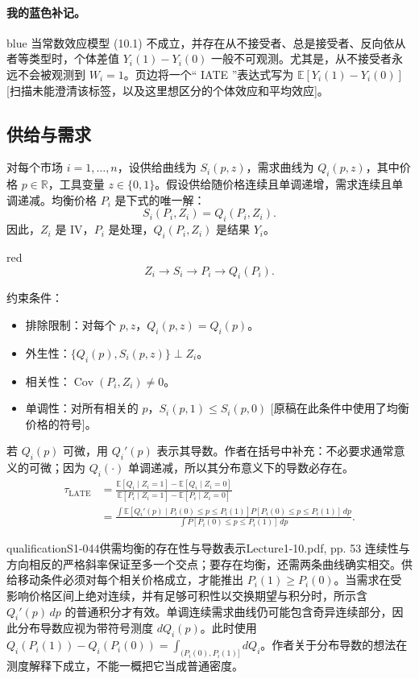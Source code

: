 \paragraph{我的蓝色补记。}
\begin{inkblock}{blue}
当常数效应模型 (10.1) 不成立，并存在从不接受者、总是接受者、反向依从者等类型时，个体差值 $Y_i(1)-Y_i(0)$ 一般不可观测。尤其是，从不接受者永远不会被观测到 $W_i=1$。页边将一个“ IATE ”表达式写为 $\mathbb E[Y_i(1)-Y_i(0)]$ [扫描未能澄清该标签，以及这里想区分的个体效应和平均效应]。
\end{inkblock}


\subsection{供给与需求}
对每个市场 $i=1,\ldots,n$，设供给曲线为 $S_i(p,z)$，需求曲线为 $Q_i(p,z)$，其中价格 $p\in\mathbb R$，工具变量 $z\in\{0,1\}$。假设供给随价格连续且单调递增，需求连续且单调递减。均衡价格 $P_i$ 是下式的唯一解：
\[
 S_i(P_i,Z_i)=Q_i(P_i,Z_i).
\]
因此，$Z_i$ 是 IV，$P_i$ 是处理，$Q_i(P_i,Z_i)$ 是结果 $Y_i$。\begin{inkblock}{red}\[ Z_i\longrightarrow S_i\longrightarrow P_i\longrightarrow Q_i(P_i). \]\end{inkblock}

约束条件：
\begin{itemize}
 \item 排除限制：对每个 $p,z$，$Q_i(p,z)=Q_i(p)$。
 \item 外生性：$\{Q_i(p),S_i(p,z)\}\perp Z_i$。
 \item 相关性：$\operatorname{Cov}(P_i,Z_i)\ne0$。
 \item 单调性：对所有相关的 $p$，$S_i(p,1)\le S_i(p,0)$ [原稿在此条件中使用了均衡价格的符号]。
\end{itemize}
若 $Q_i(p)$ 可微，用 $Q_i'(p)$ 表示其导数。作者在括号中补充：不必要求通常意义的可微；因为 $Q_i(\cdot)$ 单调递减，所以其分布意义下的导数必存在。
\begin{align*}
 \tau_{\mathrm{LATE}}
 &=\frac{\mathbb E[Q_i\mid Z_i=1]-\mathbb E[Q_i\mid Z_i=0]}
 {\mathbb E[P_i\mid Z_i=1]-\mathbb E[P_i\mid Z_i=0]}\\
 &=\frac{\displaystyle\int
 \mathbb E[Q_i'(p)\mid P_i(0)\le p\le P_i(1)]
 P[P_i(0)\le p\le P_i(1)]\,dp}
 {\displaystyle\int P[P_i(0)\le p\le P_i(1)]\,dp}.
\end{align*}
\begin{reviewnote}{qualification}{S1-044}{供需均衡的存在性与导数表示}{Lecture1-10.pdf, pp. 53}
连续性与方向相反的严格斜率保证至多一个交点；要存在均衡，还需两条曲线确实相交。供给移动条件必须对每个相关价格成立，才能推出 $P_i(1)\ge P_i(0)$。当需求在受影响价格区间上绝对连续，并有足够可积性以交换期望与积分时，所示含 $Q_i'(p)\,dp$ 的普通积分才有效。单调连续需求曲线仍可能包含奇异连续部分，因此分布导数应视为带符号测度 $dQ_i(p)$。此时使用 $Q_i(P_i(1))-Q_i(P_i(0))=\int_{(P_i(0),P_i(1)]}dQ_i$。作者关于分布导数的想法在测度解释下成立，不能一概把它当成普通密度。
\end{reviewnote}



